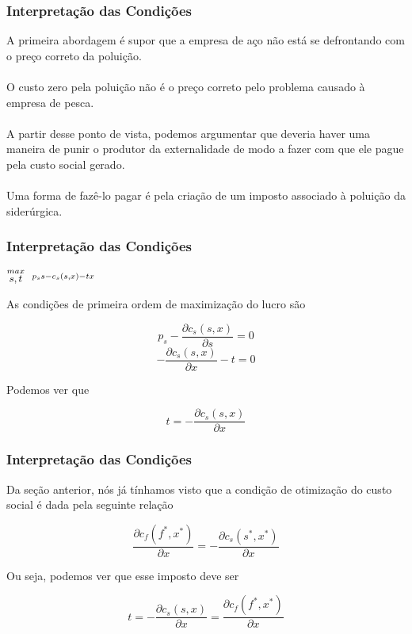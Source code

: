 \documentclass{beamer}[10]
\begin{document}
\begin{frame}
	\frametitle{Interpretação das Condições}

	A primeira abordagem é supor que a empresa de aço não está se defrontando com o preço correto da poluição.
	\\~\\
	O custo zero pela poluição não é o preço correto pelo problema causado à empresa de pesca.
	\\~\\
	A partir desse ponto de vista, podemos argumentar que deveria haver uma maneira de punir o produtor da externalidade de modo a fazer com que ele pague pela custo social gerado.
	\\~\\
	Uma forma de fazê-lo pagar é pela criação de um imposto associado à poluição da siderúrgica.

\end{frame}

\begin{frame}
	\frametitle{Interpretação das Condições}

	\begin{center}
		\LARGE $ \stackrel{max}{\text{\small $s,t$}} \ \ %
		\stackrel{p_ss - c_s(s,x) - tx}{\ } $ %
	\end{center}
	
	As condições de primeira ordem de maximização do lucro são
	
	$$ p_s - \frac{\partial c_s(s,x)}{\partial s} = 0 $$
	$$ - \frac{\partial c_s(s,x)}{\partial x} - t = 0 $$
	
	Podemos ver que
	
	$$ t = - \frac{\partial c_s(s,x)}{\partial x} $$

\end{frame}

\begin{frame}
	\frametitle{Interpretação das Condições}

	Da seção anterior, nós já tínhamos visto que a condição de otimização do custo social é dada pela seguinte relação 

	$$\frac{\partial c_f(f^*,x^*)}{\partial x} = - \frac{\partial c_s(s^*,x^*)}{\partial x} $$

	Ou seja, podemos ver que esse imposto deve ser

	$$ t = - \frac{\partial c_s(s,x)}{\partial x} = \frac{\partial c_f(f^*,x^*)}{\partial x} $$

\end{frame}
\end{document}
